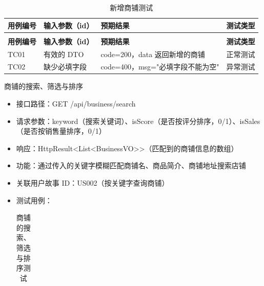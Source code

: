 \begin{levellist}
\begin{levellist}
\begin{itemize}
\begin{longtable}{>{\centering\arraybackslash}m{2cm} >{\centering\arraybackslash}m{4cm} >{\centering\arraybackslash}m{5cm} >{\centering\arraybackslash}m{2cm}}
                      \caption{新增商铺测试} \label{tab:training}                                       \\

                      \toprule
                      \textbf{用例编号} & \textbf{输入参数（id）} & \textbf{预期结果}           & \textbf{测试类型} \\
                      \midrule
                      \endfirsthead

                      \multicolumn{4}{c}{{\tablename\ \thetable{} 续表}}                            \\
                      \toprule
                      \textbf{用例编号} & \textbf{输入参数（id）} & \textbf{预期结果}           & \textbf{测试类型} \\
                      \midrule
                      \endhead

                      \bottomrule
                      \endfoot

                      TC01          & 有效的 DTO           & code=200，data 返回新增的商铺   & 正常测试          \\
                      TC02          & 缺少必填字段            & code=400，msg="必填字段不能为空" & 异常测试          \\
                  \end{longtable}
        \end{itemize}

        \item 商铺的搜索、筛选与排序
        \begin{itemize}
            \item 接口路径：GET /api/business/search
            \item 请求参数：keyword（搜索关键词）、isScore（是否按评分排序，0/1）、isSales（是否按销售量排序，0/1）
            \item 响应：HttpResult<List<BusinessVO>>（匹配到的商铺信息的数组）
            \item 功能：通过传入的关键字模糊匹配商铺名、商品简介、商铺地址搜索店铺
            \item 关联用户故事 ID：US002（按关键字查询商铺）
            \item 测试用例：
                  \begin{longtable}{>{\centering\arraybackslash}m{2cm} >{\centering\arraybackslash}m{4cm} >{\centering\arraybackslash}m{5cm} >{\centering\arraybackslash}m{2cm}}

                      \caption{商铺的搜索、筛选与排序测试} \label{tab:training}                                                  \\


\end{longtable}
\end{itemize}
\end{levellist}
\end{levellist}
